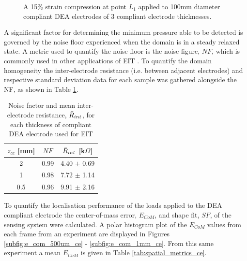 \begin{figure}[H]
	\vspace{0.1cm}
	\caption{A 15\% strain compression at point $L_1$ applied to 100mm diameter compliant DEA electrodes of 3 compliant electrode thicknesses.}
	\label{fig:EIT_thickness_compare}
\end{figure}
A significant factor for determining the minimum pressure able to be detected is governed by the noise floor experienced when the domain is in a steady relaxed state. A metric used to quantify the noise floor is the noise figure, $N\!F$, which is commonly used in other applications of EIT \cite{Adler2009, Ellingham2024} . To quantify the domain homogeneity the inter-electrode resistance (i.e. between adjacent electrodes) and respective standard deviation data for each sample was gathered alongside the NF, as shown in Table \ref{tab:NF_vals}.
\begin{table}[H]
	\centering
	\caption{Noise factor and mean inter-electrode resistance, $\Bar{R}_{int}$, for each thickness of compliant DEA electrode used for EIT}
	\label{tab:NF_vals}
	\begin{tabular}{c|c|c}
		$z_{ce}$ [mm] & $N\!F$ & $\Bar{R}_{int}$ [k$\Omega$]\\
		\hline
		2 & 0.99 & 4.40 $\pm$ 0.69 \\
		1 & 0.98 & 7.72 $\pm$ 1.14\\
		0.5 & 0.96 & 9.91 $\pm$ 2.16\\
	\end{tabular}
\end{table}
To quantify the localisation performance of the loads applied to the DEA compliant electrode the center-of-mass error, $E_{CoM}$, and shape fit, $S\!F$, of the sensing system were calculated.	A polar histogram plot of the $E_{CoM}$ values from each frame from an experiment are displayed in Figures \ref{subfig:e_com_500um_ce} - \ref{subfig:e_com_1mm_ce}. From this same experiment a mean $E_{CoM}$ is given in Table \ref{tab:spatial_metrics_ce}.

